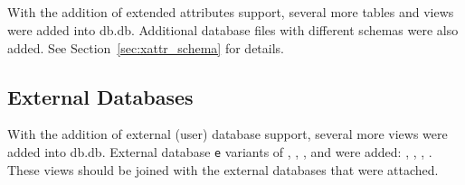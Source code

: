 \subsection{\xattrs}
With the addition of extended attributes support, several more tables
and views were added into db.db. Additional database files with
different schemas were also added. See Section~\ref{sec:xattr_schema}
for details.

\subsection{External Databases}
With the addition of external (user) database support, several more
views were added into db.db. External database \texttt{e} variants of
\vrsummary, \vrxsummary, \vrpentries, and \vrxpentries were added:
\evrsummary, \evrxsummary, \evrpentries, \evrxpentries. These views
should be joined with the external databases that were attached.
